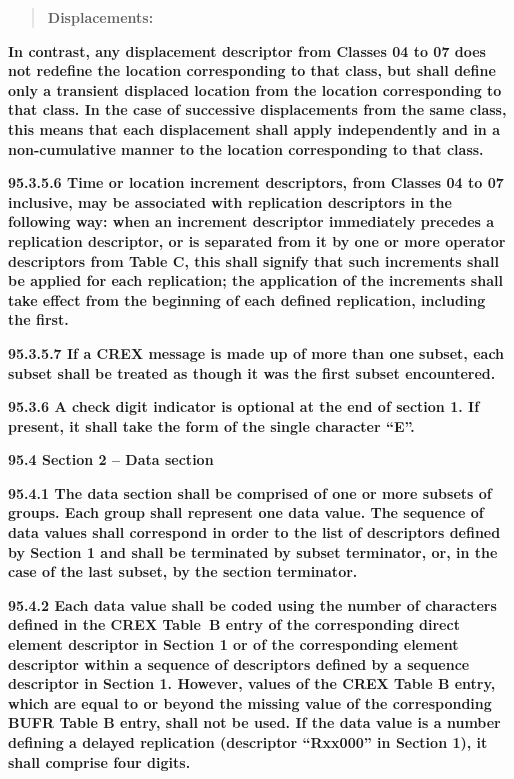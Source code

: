 \begin{quote}
\textbf{Displacements:}
\end{quote}

\textbf{In contrast, any displacement descriptor from Classes 04 to 07 does not redefine the location corresponding to that class, but shall define only a transient displaced location from the location corresponding to that class. In the case of successive displacements from the same class, this means that each displacement shall apply independently and in a non-cumulative manner to the location corresponding to that class.}

\textbf{95.3.5.6 Time or location increment descriptors, from Classes 04 to 07 inclusive, may be associated with replication descriptors in the following way: when an increment descriptor immediately precedes a replication descriptor, or is separated from it by one or more operator descriptors from Table C, this shall signify that such increments shall be applied for each replication; the application of the increments shall take effect from the beginning of each defined replication, including the first.}

\textbf{95.3.5.7 If a CREX message is made up of more than one subset, each subset shall be treated as though it was the first subset encountered.}

\textbf{95.3.6 A check digit indicator is optional at the end of section 1. If present, it shall take the form of the single character ``E''.}

\textbf{95.4 Section 2 -- Data section}

\textbf{95.4.1 The data section shall be comprised of one or more subsets of groups. Each group shall represent one data value. The sequence of data values shall correspond in order to the list of descriptors defined by Section 1 and shall be terminated by subset terminator, or, in the case of the last subset, by the section terminator.}

\textbf{95.4.2 Each data value shall be coded using the number of characters defined in the CREX Table~B entry of the corresponding direct element descriptor in Section 1 or of the corresponding element descriptor within a sequence of descriptors defined by a sequence descriptor in Section 1. However, values of the CREX Table B entry, which are equal to or beyond the missing value of the corresponding BUFR Table B entry, shall not be used. If the data value is a number defining a delayed replication (descriptor ``Rxx000'' in Section 1), it shall comprise four digits.}

